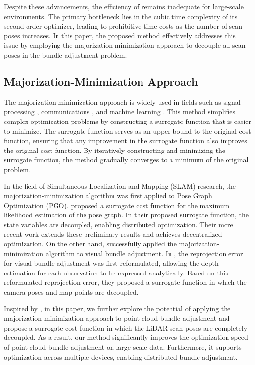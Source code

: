 Despite these advancements, the efficiency of \cite{liu2023efficient} remains inadequate for large-scale environments. The primary bottleneck lies in the cubic time complexity of its second-order optimizer, leading to prohibitive time costs as the number of scan poses increases. In this paper, the proposed method effectively addresses this issue by employing the majorization-minimization approach to decouple all scan poses in the bundle adjustment problem.

\subsection{Majorization-Minimization Approach}
The majorization-minimization approach is widely used in fields such as signal processing \cite{figueiredo2007majorization, bioucas2006total}, communications \cite{sun2016majorization, gong2020majorization}, and machine learning \cite{mairal2015incremental}. This method simplifies complex optimization problems by constructing a surrogate function that is easier to minimize. The surrogate function serves as an upper bound to the original cost function, ensuring that any improvement in the surrogate function also improves the original cost function. By iteratively constructing and minimizing the surrogate function, the method gradually converges to a minimum of the original problem.


In the field of {Simultaneous Localization and Mapping (SLAM)} research, the majorization-minimization algorithm was first applied to Pose Graph Optimization (PGO). \cite{fan2020majorization} proposed a surrogate cost function for the maximum likelihood estimation of the pose graph. In their proposed surrogate function, the state variables are decoupled, enabling distributed optimization. Their more recent work \cite{fan2023majorization} extends these preliminary results and achieves decentralized optimization. On the other hand, \cite{mmvba} successfully applied the majorization-minimization algorithm to visual bundle adjustment. In \cite{mmvba}, the reprojection error for visual bundle adjustment was first reformulated, allowing the depth estimation for each observation to be expressed analytically. Based on this reformulated reprojection error, they proposed a surrogate function in which the camera poses and map points are decoupled.

Inspired by \cite{mmvba}, in this paper, we further explore the potential of applying the majorization-minimization approach to point cloud bundle adjustment and propose a surrogate cost function in which the LiDAR scan poses are completely decoupled. As a result, our method significantly improves the optimization speed of point cloud bundle adjustment on large-scale data. Furthermore, it supports optimization across multiple devices, enabling distributed bundle adjustment.

